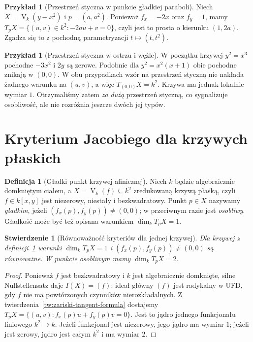 \documentclass[11pt,a4paper,openany]{report}
\numberwithin{equation}{section}
\theoremstyle{plain}
\newtheorem{stwierdzenie}[twierdzenie]{Stwierdzenie}
\theoremstyle{definition}
\newtheorem{definicja}[twierdzenie]{Definicja}
\newtheorem{przyklad}[twierdzenie]{Przykład}
\theoremstyle{remark}
\newcommand{\V}{\operatorname V}
\begin{document}
\begin{przyklad}[Przestrzeń styczna w punkcie gładkiej paraboli]
Niech $X=\V_k(y-x^2)$ i $p=(a,a^2)$.
Ponieważ $f_x=-2x$ oraz $f_y=1$, mamy
$T_pX=\{(u,v)\in k^2:-2au+v=0\}$,
czyli jest to prosta o kierunku $(1,2a)$.
Zgadza się to z pochodną parametryzacji $t\mapsto(t,t^2)$.
\end{przyklad}

\begin{przyklad}[Przestrzeń styczna w ostrzu i węźle]
W początku krzywej $y^2=x^3$ pochodne $-3x^2$ i $2y$
są zerowe. Podobnie dla $y^2=x^2(x+1)$
obie pochodne znikają w $(0,0)$. W obu przypadkach
wzór na przestrzeń styczną nie nakłada żadnego warunku
na $(u,v)$, a więc $T_{(0,0)}X=k^2$.
Krzywa ma jednak lokalnie wymiar $1$. Otrzymaliśmy
zatem \emph{za dużą} przestrzeń styczną, co sygnalizuje
osobliwość, ale nie rozróżnia jeszcze dwóch jej typów.
\end{przyklad}

\section{Kryterium Jacobiego dla krzywych płaskich}

\begin{definicja}[Gładki punkt krzywej afinicznej]
\label{def:smooth-affine-curve}
Niech $k$ będzie algebraicznie domkniętym ciałem,
a $X=\V_k(f)\subseteq k^2$ zredukowaną krzywą płaską,
czyli $f\in k[x,y]$ jest niezerowy, niestały i bezkwadratowy.
Punkt $p\in X$ nazywamy \emph{gładkim}, jeżeli
$(f_x(p),f_y(p))\ne(0,0)$; w przeciwnym razie
jest \emph{osobliwy}. Gładkość może być też opisana
warunkiem $\dim_kT_pX=1$.
\end{definicja}

\begin{stwierdzenie}[Równoważność kryteriów dla jednej krzywej]
Dla krzywej z definicji~\ref{def:smooth-affine-curve}
warunki $\dim_k T_pX=1$ i
$(f_x(p),f_y(p))\ne(0,0)$ są równoważne.
W punkcie osobliwym mamy $\dim_kT_pX=2$.
\end{stwierdzenie}
\begin{proof}
Ponieważ $f$ jest bezkwadratowy i $k$ jest algebraicznie
domknięte, silne Nullstellensatz daje $I(X)=(f)$:
ideał główny $(f)$ jest radykalny w UFD, gdy $f$ nie ma
powtórzonych czynników nierozkładalnych.
Z twierdzenia~\ref{tw:zariski-tangent-formula} dostajemy
$T_pX=\{(u,v):f_x(p)u+f_y(p)v=0\}$.
Jest to jądro jednego funkcjonału liniowego $k^2\to k$.
Jeżeli funkcjonał jest niezerowy, jego jądro ma wymiar $1$;
jeżeli jest zerowy, jądro jest całym $k^2$ i ma wymiar $2$.
\end{proof}
\end{document}
